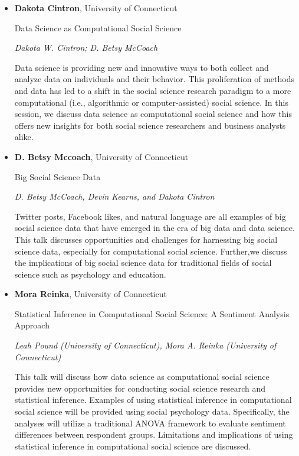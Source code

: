 \begin{itemize}
\item \textbf{Dakota Cintron}, University of Connecticut

Data Science as Computational Social Science

\emph{\footnotesize Dakota W. Cintron; D. Betsy McCoach}

Data science is providing new and innovative ways to both collect and analyze data on individuals and their behavior. This proliferation of methods and data has led to a shift in the social science research paradigm to a more computational (i.e., algorithmic or computer-assisted) social science. In this session, we discuss data science as computational social science and how this offers new insights for both social science researchers and business analysts alike.

\item \textbf{D. Betsy Mccoach}, University of Connecticut

Big Social Science Data

\emph{\footnotesize D. Betsy McCoach, Devin Kearns, and Dakota Cintron}

Twitter posts, Facebook likes, and natural language are all examples of big social science data that have emerged in the era of big data and data science. This talk discusses opportunities and challenges for harnessing big social science data, especially for computational social science. Further,we discuss the implications of big social science data for traditional fields of social science such as psychology and education.

\item \textbf{Mora Reinka}, University of Connecticut

Statistical Inference in Computational Social Science: A Sentiment Analysis Approach

\emph{\footnotesize Leah Pound (University of Connecticut), Mora A. Reinka (University of Connecticut)}

This talk will discuss how data science as computational social science provides new opportunities for conducting social science research and statistical inference. Examples of using statistical inference in computational social science will be provided using social psychology data. Specifically, the analyses will utilize a traditional ANOVA framework to evaluate sentiment differences between respondent groups. Limitations and implications of using statistical inference in computational social science are discussed.

\end{itemize}


